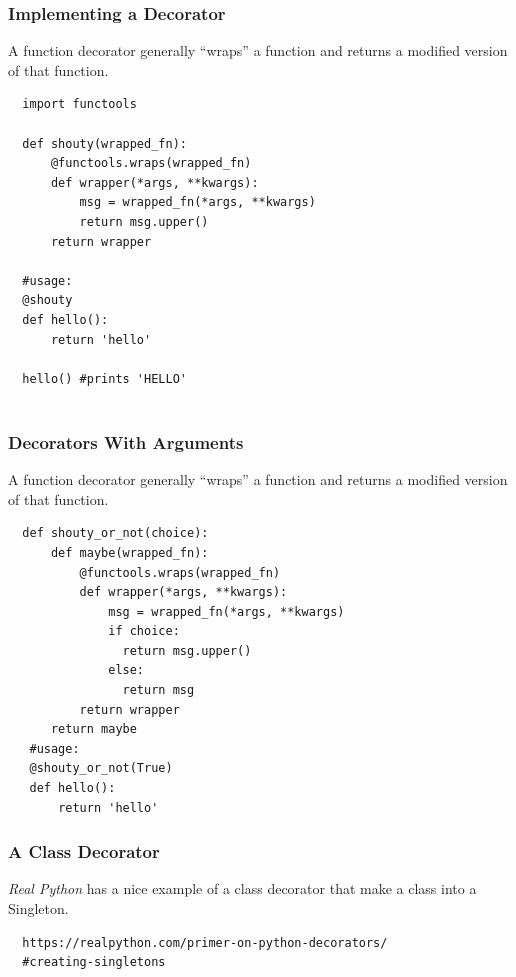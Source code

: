\documentclass[10pt]{beamer}
\begin{document}
\begin{frame}[fragile]
  \frametitle{Implementing a Decorator}
  A function decorator generally ``wraps'' a function and returns a modified version of that function.  
  \vspace{5mm}
  \begin{verbatim}
  import functools
  
  def shouty(wrapped_fn):
      @functools.wraps(wrapped_fn)
      def wrapper(*args, **kwargs):
          msg = wrapped_fn(*args, **kwargs)
          return msg.upper()
      return wrapper
  
  #usage:    
  @shouty
  def hello():
      return 'hello' 
      
  hello() #prints 'HELLO'           
  
  \end{verbatim}
  
\end{frame} 

\begin{frame}[fragile]
  \frametitle{Decorators With Arguments}
  A function decorator generally ``wraps'' a function and returns a modified version of that function.  
  \vspace{5mm}
  \begin{verbatim}
  def shouty_or_not(choice):
      def maybe(wrapped_fn):
          @functools.wraps(wrapped_fn)
          def wrapper(*args, **kwargs):
              msg = wrapped_fn(*args, **kwargs)
              if choice:
                return msg.upper()
              else:
                return msg  
          return wrapper
      return maybe  
   #usage:
   @shouty_or_not(True)
   def hello():
       return 'hello'   
   \end{verbatim}
  
\end{frame} 

\begin{frame}[fragile]
  \frametitle{A Class Decorator}
  
  \emph{Real Python} has a nice example of a class decorator that make a class into 
  a Singleton.
  
  \vspace{5mm}
  \begin{verbatim}
  https://realpython.com/primer-on-python-decorators/
  #creating-singletons
  \end{verbatim}
\end{frame}
\end{document}
